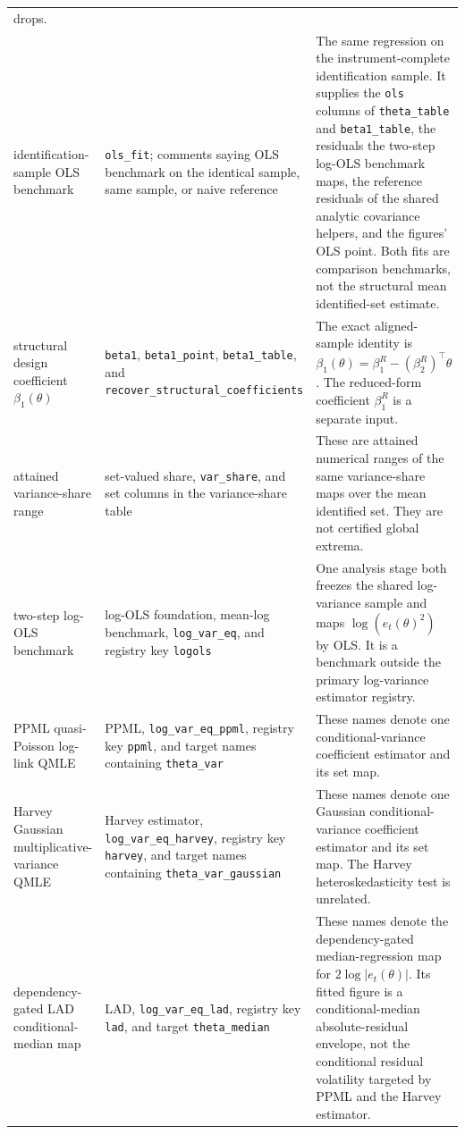 \documentclass[11pt]{article}
\DeclareRobustCommand{\code}[1]{%
  \ifmmode\text{\ttfamily\detokenize{#1}}\else\nolinkurl{#1}\fi}
\begin{document}
\begin{longtable}{@{}>{\raggedright\arraybackslash}p{}
  >{\raggedright\arraybackslash}p{}
  >{\raggedright\arraybackslash}p{}@{}}
drops.\\
identification-sample OLS benchmark & \code{ols_fit}; comments saying OLS
benchmark on the identical sample, same sample, or naive reference & The same
regression on the instrument-complete identification sample. It supplies the
\code{ols} columns of \code{theta_table} and \code{beta1_table}, the residuals
the two-step log-OLS benchmark maps, the reference residuals of the shared
analytic covariance helpers, and the figures' OLS point. Both fits are
comparison benchmarks, not the structural mean identified-set estimate.\\
structural design coefficient $\beta_1(\theta)$ & \code{beta1},
\code{beta1_point}, \code{beta1_table}, and
\code{recover_structural_coefficients} & The exact aligned-sample identity is
$\beta_1(\theta)=\beta_1^R-(\beta_2^R)^\top\theta$. The reduced-form coefficient
$\beta_1^R$ is a separate input.\\
attained variance-share range & set-valued share, \code{var_share}, and set
columns in the variance-share table & These are attained numerical ranges of the
same variance-share maps over the mean identified set. They are not certified
global extrema.\\
two-step log-OLS benchmark & log-OLS foundation, mean-log benchmark,
\code{log_var_eq}, and registry key \code{logols} & One analysis stage both
freezes the shared log-variance sample and maps
$\log(e_t(\theta)^2)$ by OLS. It is a benchmark outside the primary
log-variance estimator registry.\\
PPML quasi-Poisson log-link QMLE & PPML, \code{log_var_eq_ppml}, registry key
\code{ppml}, and target names containing \code{theta_var} & These names denote
one conditional-variance coefficient estimator and its set map.\\
Harvey Gaussian multiplicative-variance QMLE & Harvey estimator,
\code{log_var_eq_harvey}, registry key \code{harvey}, and target names containing
\code{theta_var_gaussian} & These names denote one Gaussian
conditional-variance coefficient estimator and its set map. The Harvey
heteroskedasticity test is unrelated.\\
dependency-gated LAD conditional-median map & LAD, \code{log_var_eq_lad}, registry key
\code{lad}, and target \code{theta_median} & These names denote the
dependency-gated median-regression map for $2\log|e_t(\theta)|$. Its fitted
figure is a conditional-median absolute-residual envelope, not the conditional
residual volatility targeted by PPML and the Harvey estimator.\\

\end{longtable}
\end{document}
